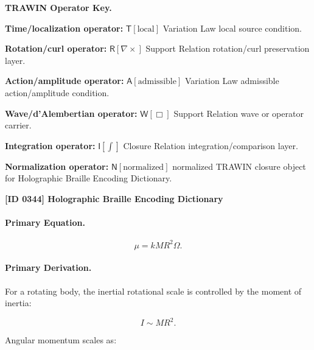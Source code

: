 \par\vspace{0.45\baselineskip}
\noindent\begin{minipage}[t]{\linewidth}
\begingroup
\small
\raggedright
\textbf{TRAWIN Operator Key.}\par
\noindent\textbf{Time/localization operator:} $\mathsf{T}\!\left[\mathrm{local}\right]$ Variation Law local source condition.\par
\noindent\textbf{Rotation/curl operator:} $\mathsf{R}\!\left[\nabla\times\right]$ Support Relation rotation/curl preservation layer.\par
\noindent\textbf{Action/amplitude operator:} $\mathsf{A}\!\left[\mathrm{admissible}\right]$ Variation Law admissible action/amplitude condition.\par
\noindent\textbf{Wave/d'Alembertian operator:} $\mathsf{W}\!\left[\Box\right]$ Support Relation wave or operator carrier.\par
\noindent\textbf{Integration operator:} $\mathsf{I}\!\left[\int\right]$ Closure Relation integration/comparison layer.\par
\noindent\textbf{Normalization operator:} $\mathsf{N}\!\left[\mathrm{normalized}\right]$ normalized TRAWIN closure object for Holographic Braille Encoding Dictionary.\par
\endgroup
\end{minipage}

\clearpage
\noindent\textbf{[ID 0344] Holographic Braille Encoding Dictionary}\par
\vspace{0.35em}
\paragraph{Primary Equation.}
\begin{equation}
\mu
=
kMR^2\Omega .
\end{equation}

\paragraph{Primary Derivation.}
For a rotating body, the inertial rotational scale is controlled by the moment of inertia:

\begin{equation}
I
\sim
MR^2 .
\end{equation}

Angular momentum scales as:

